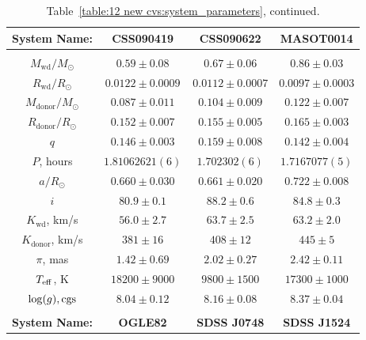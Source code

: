 \begin{table}
    \centering
    \caption{Table~\ref{table:12 new cvs:system_parameters}, continued.}
    \label{table:12 new cvs:system_parameters cont 1}
    \begin{tabular}{cccc}
        \hline
        \textbf{System Name:}      & \textbf{CSS090419}     & \textbf{CSS090622}    & \textbf{MASOT0014}     \\
        \hline \hline \\
        $M_\mathrm{wd}/M_\odot$    & $0.59\pm0.08$          & $0.67\pm0.06$         & $0.86\pm0.03$          \\
        $R_\mathrm{wd}/R_\odot$    & $0.0122\pm0.0009$      & $0.0112\pm0.0007$     & $0.0097\pm0.0003$      \\
        $M_\mathrm{donor}/M_\odot$ & $0.087\pm0.011$        & $0.104\pm0.009$       & $0.122\pm0.007$        \\
        $R_\mathrm{donor}/R_\odot$ & $0.152\pm0.007$        & $0.155\pm0.005$       & $0.165\pm0.003$        \\
        $q$                        & $0.146\pm0.003$        & $0.159\pm0.008$       & $0.142\pm0.004$        \\
        \hline
        $P$, hours                 & $1.81062621(6)$        & $1.702302(6)$         & $1.7167077(5)$         \\
        $a/R_\odot$                & $0.660\pm0.030$        & $0.661\pm0.020$       & $0.722\pm0.008$        \\
        $i$                        & $80.9\pm0.1$           & $88.2\pm0.6$          & $84.8\pm0.3$           \\
        $K_\mathrm{wd}$, km/s      & $56.0\pm2.7$           & $63.7\pm2.5$          & $63.2\pm2.0$           \\
        $K_\mathrm{donor}$, km/s   & $381\pm16$             & $408\pm12$            & $445\pm5$              \\
        \hline
        $\pi$, mas                 & $1.42\pm0.69$          & $2.02\pm0.27$         & $2.42\pm0.11$          \\
        $T_{\rm eff}$, K           & $18200\pm9000$         & $9800\pm1500$         & $17300\pm1000$         \\
        $\log(g), {\rm cgs}$       & $8.04\pm0.12$          & $8.16\pm0.08$         & $8.37\pm0.04$          \\
        \hline
        \hline \\[2em]
        \hline
        \textbf{System Name:}       & \textbf{OGLE82}   & \textbf{SDSS J0748}    & \textbf{SDSS J1524}     \\

\end{tabular}
\end{table}
